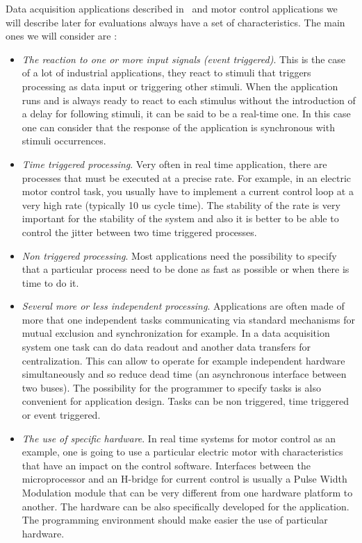 \documentclass[10pt]{report}
\begin{document}
Data acquisition applications described in~\cite{Delchini:95} and motor control applications we will describe later for
evaluations always have a set of characteristics. The main ones we will consider are :

\begin{itemize}

\item {\em The reaction to one or more input signals (event triggered)}. This is the case of a lot of industrial applications,
they react to stimuli that triggers processing as data input or triggering other stimuli. When the application runs and is
always ready to react to each stimulus without the introduction of a delay for following stimuli, it can be said to be a
real-time one. In this case one can consider that the response of the application is synchronous with stimuli occurrences.

\item {\em Time triggered processing}. Very often in real time application, there are processes that must be executed
at a precise rate. For example, in an electric motor control task, you usually have to implement a current control loop
at a very high rate (typically 10 us cycle time). The stability of the rate is very important for the stability of the
system and also it is better to be able to control the jitter between two time triggered processes.

\item {\em Non triggered processing}. Most applications need the possibility to specify that a particular process need to be
done as fast as possible or when there is time to do it.

\item {\em Several more or less independent processing}. Applications are often made of more that one independent tasks
communicating via standard mechanisms for mutual exclusion and synchronization for example. In a data acquisition system
one task can do data readout and another data transfers for centralization. This can allow to operate for example
independent hardware simultaneously and so reduce dead time (an asynchronous interface between two buses). The possibility
for the programmer to specify tasks is also convenient for application design. Tasks can be non triggered, time triggered
or event triggered.

\item {\em The use of specific hardware}. In real time systems for motor control as an example, one is going to use
a particular electric motor with characteristics that have an impact on the control software. Interfaces between the
microprocessor and an H-bridge for current control is usually a Pulse Width Modulation module that can be very different
from one hardware platform to another. The hardware can be also specifically developed for the application. The programming
environment should make easier the use of particular hardware.

\end{itemize}
\end{document}
